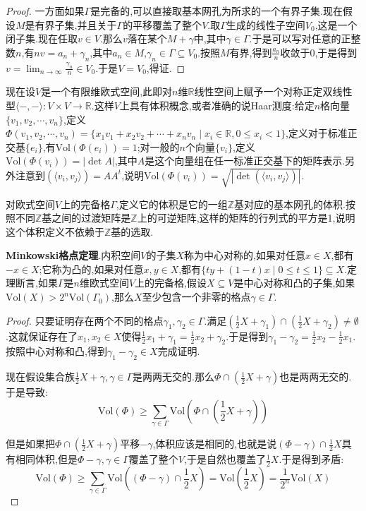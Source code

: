 \begin{enumerate}
\begin{proof}
    	一方面如果$\Gamma$是完备的,可以直接取基本网孔为所求的一个有界子集.现在假设$M$是有界子集,并且关于$\Gamma$的平移覆盖了整个$V$.取$\Gamma$生成的线性子空间$V_0$,这是一个闭子集.现在任取$v\in V$.那么$v$落在某个$M+\gamma$中,其中$\gamma\in\Gamma$.于是可以写对任意的正整数$n$,有$nv=a_n+\gamma_n$,其中$a_n\in M$,$\gamma_n\in\Gamma\subseteq V_0$.按照$M$有界,得到$\frac{a_n}{n}$收敛于0,于是得到$v=\lim_{n\to\infty}\frac{\gamma_n}{n}\in V_0$.于是$V=V_0$,得证.
    \end{proof}
\end{enumerate}

现在设$V$是一个有限维欧式空间,此即对$n$维$\mathbb{R}$线性空间上赋予一个对称正定双线性型$\langle-,-\rangle:V\times V\to\mathbb{R}$.这样$V$上具有体积概念,或者准确的说Haar测度:给定$n$格向量$\{v_1,v_2,\cdots,v_n\}$,定义$\Phi(v_1,v_2,\cdots,v_n)=\{x_1v_1+x_2v_2+\cdots+x_nv_n\mid x_i\in\mathbb{R},0\le x_i<1\}$,定义对于标准正交基$\{e_i\}$,有$\mathrm{Vol}(\Phi(e_i))=1$;对一般的$n$个向量$\{v_i\}$,定义$\mathrm{Vol}(\Phi(v_i))=|\det A|$,其中$A$是这个向量组在任一标准正交基下的矩阵表示.另外注意到$(\langle v_i,v_j\rangle)=AA^t$,说明$\mathrm{Vol}(\Phi(v_i))=\sqrt{|\det(\langle v_i,v_j\rangle)|}$.

对欧式空间$V$上的完备格$\Gamma$,定义它的体积是它的一组$\mathbb{Z}$基对应的基本网孔的体积.按照不同$\mathbb{Z}$基之间的过渡矩阵是$\mathbb{Z}$上的可逆矩阵,这样的矩阵的行列式的平方是1,说明这个体积定义不依赖于$\mathbb{Z}$基的选取.

\textbf{Minkowski格点定理}.内积空间$V$的子集$X$称为中心对称的,如果对任意$x\in X$,都有$-x\in X$;它称为凸的,如果对任意$x,y\in X$,都有$\{ty+(1-t)x\mid 0\le t\le1\}\subseteq X$.定理断言,如果$\Gamma$是$n$维欧式空间$V$上的完备格,假设$X\subseteq V$是中心对称和凸的子集,如果$\mathrm{Vol}(X)>2^n\mathrm{Vol}(\Gamma_0)$,那么$X$至少包含一个非零的格点$\gamma\in\Gamma$.
\begin{proof}
	
	只要证明存在两个不同的格点$\gamma_1,\gamma_2\in\Gamma$.满足$\left(\frac{1} {2}X+\gamma_1\right)\cap\left(\frac{1}{2}X+\gamma_2\right)\not=\emptyset$.这就保证存在了$x_1,x_2\in X$使得$\frac{1} {2}x_1+\gamma_1=\frac{1}{2}x_2+\gamma_2$.于是得到$\gamma_1-\gamma_2=\frac{1}{2}x_2-\frac{1}{2}x_1$.按照中心对称和凸,得到$\gamma_1-\gamma_2\in X$完成证明.
	
	现在假设集合族$\frac{1}{2}X+\gamma,\gamma\in\Gamma$是两两无交的.那么$\Phi\cap\left(\frac{1}{2}X+\gamma\right)$也是两两无交的.于是导致:
	$$\mathrm{Vol}(\Phi)\ge\sum_{\gamma\in\Gamma}\mathrm{Vol}\left(\Phi\cap(\frac{1}{2}X+\gamma)\right)$$
	
	但是如果把$\Phi\cap\left(\frac{1}{2}X+\gamma\right)$平移$-\gamma$,体积应该是相同的,也就是说$\left(\Phi-\gamma\right)\cap\frac{1}{2}X$具有相同体积,但是$\Phi-\gamma,\gamma\in\Gamma$覆盖了整个$V$,于是自然也覆盖了$\frac{1} {2}X$.于是得到矛盾:
	$$\mathrm{Vol}(\Phi)\ge\sum_{\gamma\in\Gamma}\mathrm{Vol}\left((\Phi-\gamma)\cap\frac{1}{2}X\right)=\mathrm{Vol}(\frac{1}{2}X)=\frac{1}{2^n}\mathrm{Vol}(X)$$
\end{proof}

